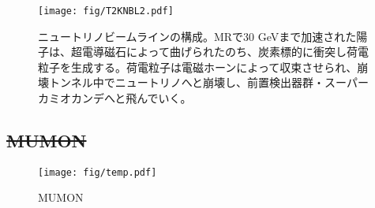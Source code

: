 \begin{figure}[htbp]
\centering
\texttt{[image: fig/T2KNBL2.pdf]}
\caption[ニュートリノビームラインの構成]{ニュートリノビームラインの構成。MRで30 GeVまで加速された陽子は、超電導磁石によって曲げられたのち、炭素標的に衝突し荷電粒子を生成する。荷電粒子は電磁ホーンによって収束させられ、崩壊トンネル中でニュートリノへと崩壊し、前置検出器群・スーパーカミオカンデへと飛んでいく。}
\label{T2KNeutrinoBeamline}
\end{figure}


%



\subsection{\sout{MUMON}}

\begin{figure}[htb]
\begin{center}
\texttt{[image: fig/temp.pdf]}
\caption[MUMON]{MUMON}
\label{MUMON}
\end{center}
\end{figure}


